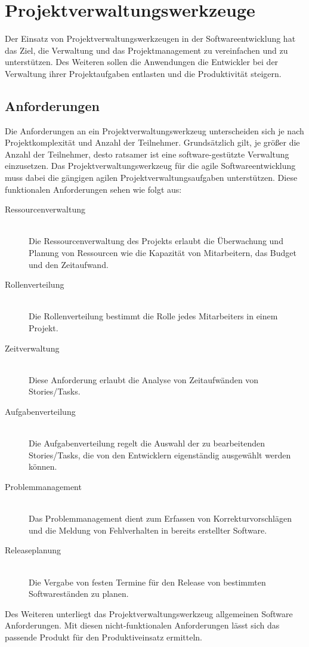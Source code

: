 \section{Projektverwaltungswerkzeuge}
Der Einsatz von Projektverwaltungswerkzeugen in der Softwareentwicklung hat das Ziel, die Verwaltung und das Projektmanagement zu vereinfachen und zu unterstützen. Des Weiteren sollen die Anwendungen die Entwickler bei der Verwaltung ihrer Projektaufgaben entlasten und die Produktivität steigern.\\

\subsection{Anforderungen}
Die Anforderungen an ein Projektverwaltungswerkzeug unterscheiden sich je nach Projektkomplexität und Anzahl der Teilnehmer. Grundsätzlich gilt, je größer die Anzahl der Teilnehmer, desto ratsamer ist eine software-gestützte Verwaltung einzusetzen.
Das Projektverwaltungswerkzeug für die agile Softwareentwicklung muss dabei die gängigen agilen Projektverwaltungsaufgaben unterstützen. Diese funktionalen Anforderungen sehen wie folgt aus:

\begin{description}
	\item[Ressourcenverwaltung]\hspace*{1em}\\
Die Ressourcenverwaltung des Projekts erlaubt die Überwachung und Planung von Ressourcen wie die Kapazität von Mitarbeitern, das Budget und den Zeitaufwand.
	\item[Rollenverteilung]\hspace*{1em}\\
Die Rollenverteilung bestimmt die Rolle jedes Mitarbeiters in einem Projekt.
	\item[Zeitverwaltung]\hspace*{1em}\\
Diese Anforderung erlaubt die Analyse von Zeitaufwänden von Stories/Tasks.
	\item[Aufgabenverteilung]\hspace*{1em}\\
Die Aufgabenverteilung regelt die Auswahl der zu bearbeitenden Stories/Tasks, die von den Entwicklern eigenständig ausgewählt werden können.
	\item[Problemmanagement]\hspace*{1em}\\
Das Problemmanagement dient zum Erfassen von Korrekturvorschlägen und die Meldung von Fehlverhalten in bereits erstellter Software. 
	\item[Releaseplanung]\hspace*{1em}\\
Die Vergabe von festen Termine für den Release von bestimmten Softwareständen zu planen.\\
\end{description}
Des Weiteren unterliegt das Projektverwaltungswerkzeug allgemeinen Software Anforderungen. Mit diesen nicht-funktionalen Anforderungen lässt sich das passende Produkt für den Produktiveinsatz ermitteln.


